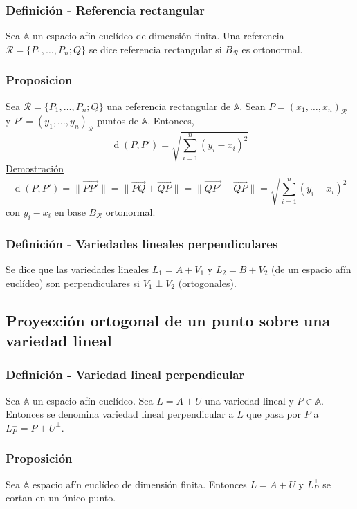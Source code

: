 \documentclass[12pt, a4paper, ones, notitlepage, openany,titlepage]{article}
\newcommand{\demostracion}{\noindent\underline{Demostración}}
\newcommand{\distancia}[1]{\operatorname{d}(#1)}
\begin{document}
\subsubsection{Definición - Referencia rectangular}
Sea $\mathbb{A}$ un espacio afín euclídeo de dimensión finita. Una referencia $\mathcal{R} = \{P_1,\ldots,P_n;Q\}$ se dice referencia rectangular si $B_\mathcal{R}$ es ortonormal.

\subsubsection{Proposicion}
Sea $\mathcal{R} = \{P_1,\ldots,P_n;Q\}$ una referencia rectangular de $\mathbb{A}$. Sean $P = (x_1, \ldots, x_n)_\mathcal{R}$ y $P' = (y_1, \ldots, y_n)_\mathcal{R}$ puntos de $\mathbb{A}$. Entonces,
$$
\distancia{P,P'} = \sqrt{\sum_{i = 1}^{n} (y_i - x_i)^2}
$$
\demostracion
$$
\distancia{P,P'} = \| \overrightarrow{PP'} \| = \|\overrightarrow{PQ} + \overrightarrow{QP}\| = \|\overrightarrow{QP'} - \overrightarrow{QP}\| = \sqrt{\sum_{i = 1}^{n}(y_i - x_i)^2}
$$
con $y_i - x_i$ en base $B_\mathcal{R}$ ortonormal.

\subsubsection{Definición - Variedades lineales perpendiculares}
Se dice que las variedades lineales $L_1 = A + V_1$ y $L_2 = B + V_2$ (de un espacio afín euclídeo) son perpendiculares si $V_1 \perp V_2$ (ortogonales).

\subsection{Proyección ortogonal de un punto sobre una variedad lineal}

\subsubsection{Definición - Variedad lineal perpendicular}
Sea $\mathbb{A}$ un espacio afín euclídeo. Sea $L = A + U$ una variedad lineal y $P \in \mathbb{A}$. Entonces se denomina variedad lineal perpendicular a $L$ que pasa por $P$ a $L_P^\perp = P + U^\perp$.

\subsubsection{Proposición}
Sea $\mathbb{A}$ espacio afín euclídeo de dimensión finita. Entonces $L = A + U$ y $L_P^\perp$ se cortan en un único punto.
\end{document}
